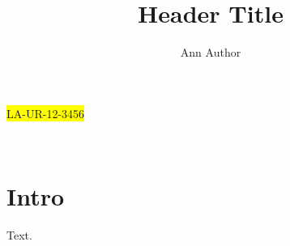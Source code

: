 \documentclass{article}
\title{Header Title}\author{Ann Author}
\begin{document}
\noindent\colorbox{yellow}{LA-UR-12-3456}

\begin{center}{\Large\@title}\\[1em]\@author\end{center}
\section{Intro}
Text.
\end{document}

